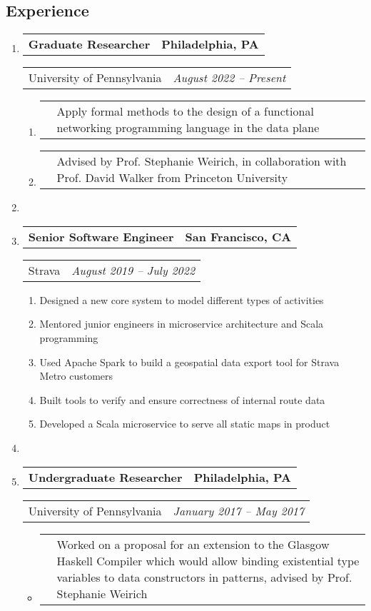 \documentclass[letterpaper]{article}
\makeatletter
\newcommand*{\tabulardef}[3]{\begin{tabular}[t]{@{}lp{\dimexpr\linewidth-#1}@{}}
    #2&#3
\end{tabular}}
\newcommand{\headerrow}[2]
{\begin{tabular*}{\linewidth}{l@{\extracolsep{\fill}}r}
	#1 &
	#2 \\
\end{tabular*}}
\makeatother
\begin{document}
\subsection*{Experience}

\begin{enumerate}[label=]
	\parskip=-0.25em

	\item
		\headerrow
			{\textbf{Graduate Researcher}}
			{\textbf{Philadelphia, PA}}
	\headerrow
		{University of Pennsylvania}
		{\emph{August 2022 -- Present}}
    \begin{enumerate}[label= *]
	\parskip=-0.1em
        \item\tabulardef{5cm}{}{Apply formal methods to the design of a functional
            networking programming language in the data plane}
        \item\tabulardef{5cm}{}{Advised by
            Prof. Stephanie Weirich, in collaboration with Prof. David
            Walker from Princeton University}
	\end{enumerate}

    \item

	\item
		\headerrow
			{\textbf{Senior Software Engineer}}
			{\textbf{San Francisco, CA}}
	\headerrow
		{Strava}
		{\emph{August 2019 -- July 2022}}
	\begin{enumerate}[label= *]
	\parskip=-0.1em
        \item Designed a new core system to model different types of activities
        \item Mentored junior engineers in microservice architecture and Scala programming
		\item Used Apache Spark to build a geospatial data export tool for Strava Metro customers
		\item Built tools to verify and ensure correctness of internal route data
		\item Developed a Scala microservice to serve all static maps in product
	\end{enumerate}
	
    \item 

	\item
		\headerrow
			{\textbf{Undergraduate Researcher}}
			{\textbf{Philadelphia, PA}}
	\headerrow
		{University of Pennsylvania}
		{\emph{January 2017 -- May 2017}}
  	\begin{itemize}[label= *]
	\parskip=-0.1em
		\item\tabulardef{5cm}{}{Worked on a proposal for an extension to the Glasgow Haskell Compiler which would allow binding existential type variables to data constructors in patterns, advised by Prof. Stephanie Weirich}
	\end{itemize}
\end{enumerate}
\end{document}
